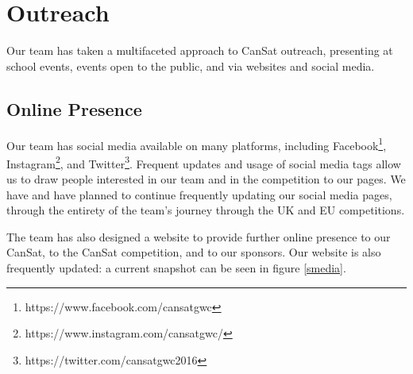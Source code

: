 \documentclass[]{report}
\begin{document}
	
	\chapter{Outreach}
	Our team has taken a multifaceted approach to CanSat outreach, presenting at school events, events open to the public, and via websites and social media.
	\section{Online Presence}
	Our team has social media available on many platforms, including Facebook\footnote{https://www.facebook.com/cansatgwc}, Instagram\footnote{https://www.instagram.com/cansatgwc/}, and Twitter\footnote{https://twitter.com/cansatgwc2016}. Frequent updates and usage of social media tags allow us to draw people interested in our team and in the competition to our pages. We have and have planned to continue frequently updating our social media pages, through the entirety of the team's journey through the UK and EU competitions.
	
	The team has also designed a website to provide further online presence to our CanSat, to the CanSat competition, and to our sponsors. Our website is also frequently updated: a current snapshot can be seen in figure \ref{smedia}. 
	
\end{document}
